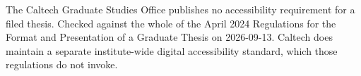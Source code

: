 %
%

%
	{The Caltech Graduate Studies Office publishes no accessibility requirement
	 for a filed thesis. Checked against the whole of the April 2024
	 Regulations for the Format and Presentation of a Graduate Thesis on
	 2026-09-13. Caltech does maintain a separate institute-wide digital
	 accessibility standard, which those regulations do not invoke.}

